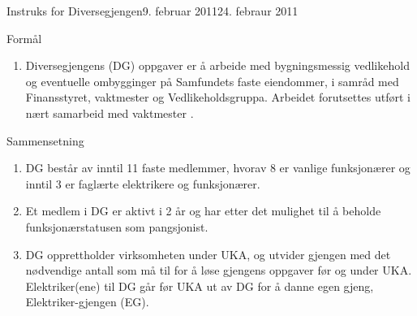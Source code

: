 

\begin{instruks}{Instruks for Diversegjengen}{9. februar 2011}{24. febraur 2011}

    \begin{instruksledd}{Formål}
        \begin{enumerate}
            \item Diversegjengens (DG) oppgaver er å arbeide med bygningsmessig vedlikehold og eventuelle
                ombygginger på Samfundets faste eiendommer, i samråd med Finansstyret, vaktmester og Vedlikeholdsgruppa.
                Arbeidet forutsettes utført i nært samarbeid med vaktmester .
        \end{enumerate}
    \end{instruksledd}

    \begin{instruksledd}{Sammensetning}
        \begin{enumerate}
            \item DG består av inntil 11 faste medlemmer, hvorav 8 er vanlige funksjonærer
                og inntil 3 er faglærte elektrikere og funksjonærer.
            \item Et medlem i DG er aktivt i 2 år og har etter det mulighet til å beholde
                funksjonærstatusen som pangsjonist.
            \item DG opprettholder virksomheten under UKA, og utvider gjengen med det nødvendige antall
                som må til for å løse gjengens oppgaver før og under UKA. Elektriker(ene) til DG går før UKA ut av DG for å
                danne egen gjeng, Elektriker-gjengen (EG).
        \end{enumerate}
    \end{instruksledd}


\end{instruks}
